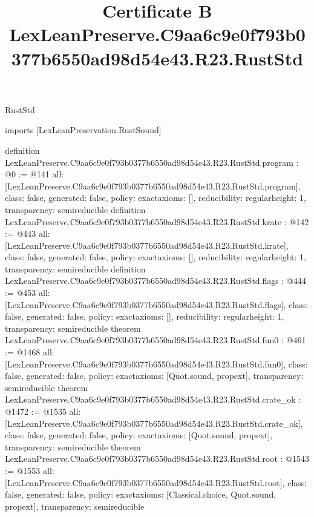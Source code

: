 \begin{lexlean}{RustStd}
\title{Certificate B LexLeanPreserve.C9aa6c9e0f793b0377b6550ad98d54e43.R23.RustStd}
\begin{coremodule}
imports [LexLeanPreservation.RustSound]

definition LexLeanPreserve.C9aa6c9e0f793b0377b6550ad98d54e43.R23.RustStd.program : @0 := @141 {
  all: [LexLeanPreserve.C9aa6c9e0f793b0377b6550ad98d54e43.R23.RustStd.program],
  class: false,
  generated: false,
  policy: exact{axioms: []},
  reducibility: regular{height: 1},
  transparency: semireducible
}
definition LexLeanPreserve.C9aa6c9e0f793b0377b6550ad98d54e43.R23.RustStd.krate : @142 := @443 {
  all: [LexLeanPreserve.C9aa6c9e0f793b0377b6550ad98d54e43.R23.RustStd.krate],
  class: false,
  generated: false,
  policy: exact{axioms: []},
  reducibility: regular{height: 1},
  transparency: semireducible
}
definition LexLeanPreserve.C9aa6c9e0f793b0377b6550ad98d54e43.R23.RustStd.flags : @444 := @453 {
  all: [LexLeanPreserve.C9aa6c9e0f793b0377b6550ad98d54e43.R23.RustStd.flags],
  class: false,
  generated: false,
  policy: exact{axioms: []},
  reducibility: regular{height: 1},
  transparency: semireducible
}
theorem LexLeanPreserve.C9aa6c9e0f793b0377b6550ad98d54e43.R23.RustStd.fun0 : @461 := @1468 {
  all: [LexLeanPreserve.C9aa6c9e0f793b0377b6550ad98d54e43.R23.RustStd.fun0],
  class: false,
  generated: false,
  policy: exact{axioms: [Quot.sound, propext]},
  transparency: semireducible
}
theorem LexLeanPreserve.C9aa6c9e0f793b0377b6550ad98d54e43.R23.RustStd.crate_ok : @1472 := @1535 {
  all: [LexLeanPreserve.C9aa6c9e0f793b0377b6550ad98d54e43.R23.RustStd.crate_ok],
  class: false,
  generated: false,
  policy: exact{axioms: [Quot.sound, propext]},
  transparency: semireducible
}
theorem LexLeanPreserve.C9aa6c9e0f793b0377b6550ad98d54e43.R23.RustStd.root : @1543 := @1553 {
  all: [LexLeanPreserve.C9aa6c9e0f793b0377b6550ad98d54e43.R23.RustStd.root],
  class: false,
  generated: false,
  policy: exact{axioms: [Classical.choice, Quot.sound, propext]},
  transparency: semireducible
}


\end{coremodule}
\end{lexlean}
